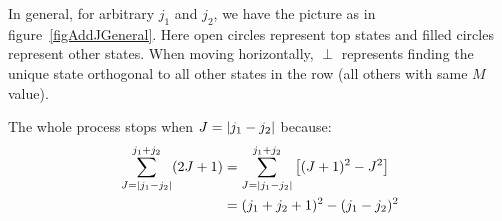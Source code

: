 \documentclass[../Main.tex]{subfiles}
\begin{document}
In general, for arbitrary $j_1$ and $j_2$, we have the picture as in figure~\ref{figAddJGeneral}. Here open circles represent top states and filled circles represent other states. When moving horizontally, $\perp$ represents finding the unique state orthogonal to all other states in the row (all others with same $M$ value).

The whole process stops when $J = \left|j_1 - j_2\right|$ because:
\begin{align*}
    \sum_{J = \left|j_1 - j_2\right|}^{j_1 + j_2} (2J + 1) &= \sum_{J = \left|j_1 - j_2\right|}^{j_1 + j_2} \left[(J+1)^2 - J^2\right] \\
    &= (j_1 + j_2 + 1)^2 - (j_1 - j_2)^2
\end{align*}
\end{document}
